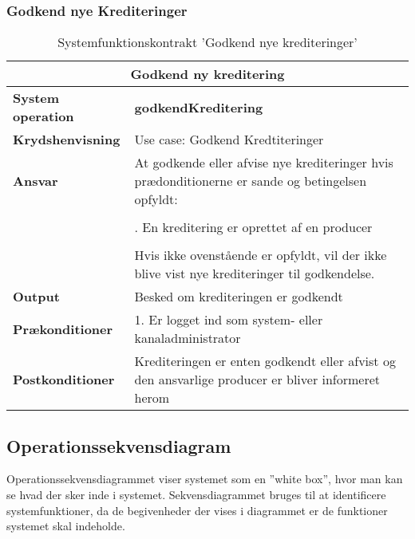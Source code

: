 \subsubsection{Godkend nye Krediteringer}
\begin{table}[H]
    \centering
    \begin{tabular}{| p{4cm} | p{12cm} |}
    \hline
    \multicolumn{2}{|c|}{\textbf{Godkend ny kreditering}}\\
    \hline
    \textbf{System operation}       & \textbf{godkendKreditering} \\ \hline
    \textbf{Krydshenvisning}        & Use case: Godkend Kredtiteringer \\ \hline
    \textbf{Ansvar}                 & At godkende eller afvise nye krediteringer hvis prædonditionerne er sande og betingelsen opfyldt:  \\ 
                                    & \\
                                    & \quad 1. En kreditering er oprettet af en producer \\
                                    & \\
                                    & Hvis ikke ovenstående er opfyldt, vil der ikke blive vist nye krediteringer til godkendelse. \\ \hline
    \textbf{Output}                 & Besked om krediteringen er godkendt \\ \hline
    \textbf{Prækonditioner}         & 1. Er logget ind som system- eller kanaladministrator \\ \hline
    \textbf{Postkonditioner}        & Krediteringen er enten godkendt eller afvist og den ansvarlige producer er bliver informeret herom \\ \hline
    \end{tabular}
    \caption{Systemfunktionskontrakt 'Godkend nye krediteringer'}
    \label{tab:kontrakter_Godkend_nye_krediteringer}
\end{table}



\subsection{Operationssekvensdiagram}
Operationssekvensdiagrammet viser systemet som en ”white box”, hvor man kan se hvad der sker
inde i systemet. Sekvensdiagrammet bruges til at identificere systemfunktioner, da de begivenheder der vises i
diagrammet er de funktioner systemet skal indeholde.

